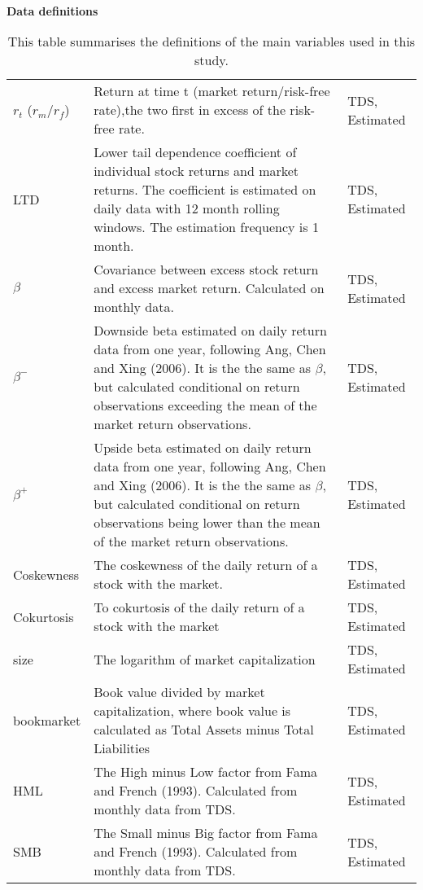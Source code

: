 \begin{table}[H]
\caption{\\ \large{\textbf{Data definitions}}}
\captionsetup{font = footnotesize, justification = justified, width = \linewidth}
\caption*{This table summarises the definitions of the main variables
                        used in this study.}
\centering
\label{tab:data_definitions}
\begin{tabular}[t]{>{\raggedright\arraybackslash}p{5em}>{\raggedright\arraybackslash}p{25em}>{\raggedright\arraybackslash}p{5em}}
\toprule
\multicolumn{1}{>{\centering\arraybackslash}p{5em}}{\textbf{Variable}} & \multicolumn{1}{>{\centering\arraybackslash}p{25em}}{\textbf{Definition}} & \multicolumn{1}{>{\centering\arraybackslash}p{5em}}{\textbf{Data source}}\\
\midrule
$r_{t}$ ($r_{m}/r_{f}$) & Return at time t (market return/risk-free rate),the two first in excess
          of the risk-free rate. & TDS, Estimated\\
LTD & Lower tail dependence coefficient of individual stock returns
             and market returns. The coefficient is estimated on daily
             data with 12 month rolling windows. The estimation frequency
             is 1 month. & TDS, Estimated\\
$\beta$ & Covariance between excess stock return and excess market return. 
             Calculated on monthly data. & TDS, Estimated\\
$\beta^{-}$ & Downside beta estimated on daily return data from one year, 
             following Ang, Chen and Xing (2006). It is the the same as $\beta$,
             but calculated conditional on return observations exceeding the 
             mean of the market return observations. & TDS, Estimated\\
$\beta^{+}$ & Upside beta estimated on daily return data from one year, 
          following Ang, Chen and Xing (2006). It is the the same as $\beta$,
          but calculated conditional on return observations being lower than the 
          mean of the market return observations. & TDS, Estimated\\
\addlinespace
Coskewness & The coskewness of the daily return of a stock with the market. & TDS, Estimated\\
Cokurtosis & To cokurtosis of the daily return of a stock with the market & TDS, Estimated\\
size & The logarithm of market capitalization & TDS, Estimated\\
bookmarket & Book value divided by market capitalization, where book value is
          calculated as Total Assets minus Total Liabilities & TDS, Estimated\\
HML & The High minus Low factor from Fama and French (1993). Calculated from monthly
          data from TDS. & TDS, \vphantom{1} Estimated\\
\addlinespace
SMB & The Small minus Big factor from Fama and French (1993). Calculated from monthly
          data from TDS. & TDS, Estimated\\
\bottomrule
\end{tabular}
\end{table}
